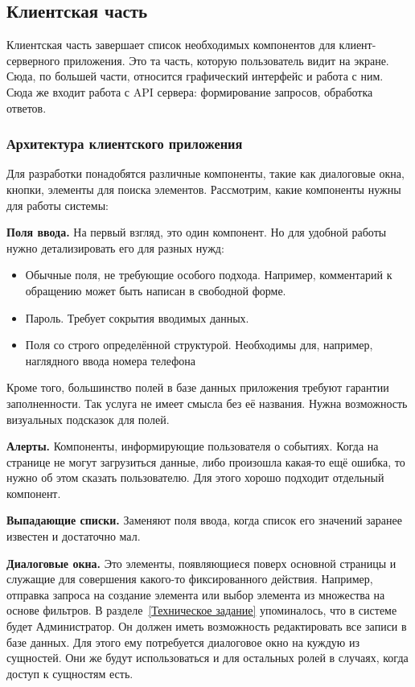 \documentclass[a4paper,article]{article}
\begin{document}
    \newpage

    \subsection{Клиентская часть}

    Клиентская часть завершает список необходимых компонентов для клиент-серверного приложения. Это та часть, которую пользователь видит на экране. Сюда, по большей части, относится графический интерфейс и работа с ним. Сюда же входит работа с API сервера: формирование запросов, обработка ответов.

    \subsubsection{Архитектура клиентского приложения}

    Для разработки понадобятся различные компоненты, такие как диалоговые окна, кнопки, элементы для поиска элементов. Рассмотрим, какие компоненты нужны для работы системы:

    \textbf{Поля ввода.} На первый взгляд, это один компонент. Но для удобной работы нужно детализировать его для разных нужд:

    \begin{itemize}[nolistsep]
        \item Обычные поля, не требующие особого подхода. Например, комментарий к обращению может быть написан в свободной форме.
        \item Пароль. Требует сокрытия вводимых данных.
        \item Поля со строго определённой структурой. Необходимы для, например, наглядного ввода номера телефона
    \end{itemize}

    Кроме того, большинство полей в базе данных приложения требуют гарантии заполненности. Так услуга не имеет смысла без её названия. Нужна возможность визуальных подсказок для полей.

    \textbf{Алерты.} Компоненты, информирующие пользователя о событиях. Когда на странице не могут загрузиться данные, либо произошла какая-то ещё ошибка, то нужно об этом сказать пользователю. Для этого хорошо подходит отдельный компонент.

    \textbf{Выпадающие списки.} Заменяют поля ввода, когда список его значений заранее известен и достаточно мал.

    \textbf{Диалоговые окна.} Это элементы, появляющиеся поверх основной страницы и служащие для совершения какого-то фиксированного действия. Например, отправка запроса на создание элемента или выбор элемента из множества на основе фильтров. В разделе~\ref{Техническое задание} упоминалось, что в системе будет Администратор. Он должен иметь возможность редактировать все записи в базе данных. Для этого ему потребуется диалоговое окно на куждую из сущностей. Они же будут использоваться и для остальных ролей в случаях, когда доступ к сущностям есть.
\end{document}

